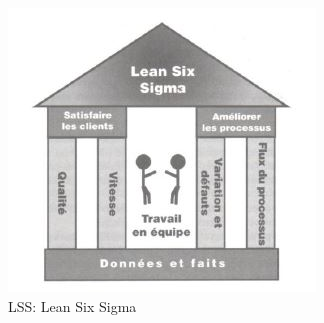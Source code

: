 \documentclass[12pt, a4paper]{thesis}
\begin{document}
\begin{figure}[!h]
\begin{center}
        \includegraphics[scale=0.7]{LSS.JPG}
        
        \caption{LSS: Lean Six Sigma}
\end{center}
\end{figure}
\end{document}
